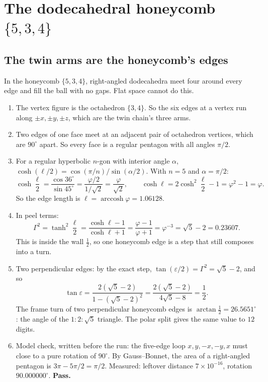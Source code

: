 \section{The dodecahedral honeycomb $\{5,3,4\}$}\label{sec:honeycomb}

\subsection{The twin arms are the honeycomb's edges} 
In the honeycomb $\{5,3,4\}$, right-angled dodecahedra meet four around every edge and fill the ball with no gaps. Flat space cannot do this.
\begin{enumerate}
\item The vertex figure is the octahedron $\{3,4\}$. So the six edges at a vertex run along $\pm x,\pm y,\pm z$, which are the twin chain's three arms.
\item Two edges of one face meet at an adjacent pair of octahedron vertices, which are $90^\circ$ apart. So every face is a regular pentagon with all angles $\pi/2$.
\item For a regular hyperbolic $n$-gon with interior angle $\alpha$, $\cosh(\ell/2)=\cos(\pi/n)/\sin(\alpha/2)$. With $n=5$ and $\alpha=\pi/2$:
\[\cosh\frac{\ell}{2}=\frac{\cos36^\circ}{\sin45^\circ}=\frac{\varphi/2}{1/\sqrt2}=\frac{\varphi}{\sqrt2},\qquad
\cosh\ell=2\cosh^2\frac{\ell}{2}-1=\varphi^2-1=\varphi .\]
So the edge length is $\ell=\operatorname{arccosh}\varphi=1.06128$.
\item In peel terms:
\[\Gamma^2=\tanh^2\frac{\ell}{2}=\frac{\cosh\ell-1}{\cosh\ell+1}=\frac{\varphi-1}{\varphi+1}=\varphi^{-3}=\sqrt5-2=0.23607.\]
This is inside the wall $\tfrac12$, so one honeycomb edge is a step that still composes into a turn.
\item Two perpendicular edges: by the exact step, $\tan(\varepsilon/2)=\Gamma^2=\sqrt5-2$, and so
\[\tan\varepsilon=\frac{2(\sqrt5-2)}{1-(\sqrt5-2)^2}=\frac{2(\sqrt5-2)}{4\sqrt5-8}=\frac12 .\]
The frame turn of two perpendicular honeycomb edges is $\arctan\tfrac12=26.5651^\circ$: the angle of the $1:2:\sqrt5$ triangle. The polar split gives the same value to $12$ digits.
\item Model check, written before the run: the five-edge loop $x,y,-x,-y,x$ must close to a pure rotation of $90^\circ$. By Gauss--Bonnet, the area of a right-angled pentagon is $3\pi-5\pi/2=\pi/2$. Measured: leftover distance $7\times10^{-16}$, rotation $90.000000^\circ$. \textbf{Pass.}
\end{enumerate}

